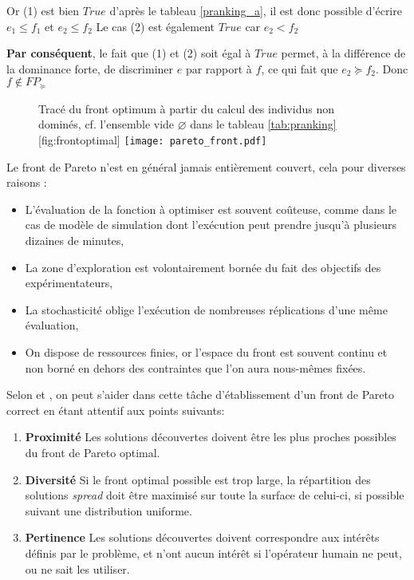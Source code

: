 Or (1) est bien $True$ d'après le tableau \ref{pranking_a}, il est donc possible d'écrire $e_1 \leq f_1$ et $e_2 \leq f_2$ Le cas (2) est également $True$ car $e_2 < f_2$

\textbf{Par conséquent}, le fait que (1) et (2) soit égal à $True$ permet, à la différence de la dominance forte, de discriminer $e$ par rapport à $f$, ce qui fait  que $e_2 \succeq f_2$. Donc $f \notin FP_{\succeq}$

\begin{figure}[!htb]
	\begin{sidecaption}{Tracé du front optimum à partir du calcul des individus non dominés, cf. l'ensemble vide $\varnothing$ dans le tableau \ref{tab:pranking}}[fig:frontoptimal]
		\centering
		\texttt{[image: pareto\_front.pdf]}{
		}
  \end{sidecaption}
\end{figure}

Le front de Pareto n'est en général jamais entièrement couvert, cela pour diverses raisons :

\begin{itemize}
\item L'évaluation de la fonction à optimiser est souvent coûteuse, comme dans le cas de modèle de simulation dont l'exécution peut prendre jusqu'à plusieurs dizaines de minutes,
\item La zone d'exploration est volontairement bornée du fait des objectifs des expérimentateurs,
\item La stochasticité oblige l'exécution de nombreuses réplications d'une même évaluation,
\item On dispose de ressources finies, or l'espace du front est souvent continu et non borné en dehors des contraintes que l'on aura nous-mêmes fixées.
\end{itemize}

Selon \textcite[70]{Weise2011} et \autocite[19]{Zitzler1999a}, on peut s'aider dans cette tâche d'établissement d'un front de Pareto correct en étant attentif aux points suivants:

\begin{enumerate}
\item{\textbf{Proximité}} Les solutions découvertes doivent être les plus proches possibles du front de Pareto optimal.
\item{\textbf{Diversité}} Si le front optimal possible est trop large, la répartition des solutions \textit{spread} doit être maximisé sur toute la surface de celui-ci, si possible suivant une distribution uniforme.
\item{\textbf{Pertinence}} Les solutions découvertes doivent correspondre aux intérêts définis par le problème, et n'ont aucun intérêt si l'opérateur humain ne peut, ou ne sait les utiliser.
\end{enumerate}

